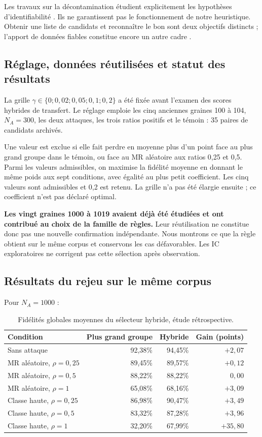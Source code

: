 \documentclass[11pt,a4paper]{article}
\begin{document}
Les travaux sur la décontamination étudient explicitement les hypothèses
d'identifiabilité \cite{scott,katz}. Ils ne garantissent pas le fonctionnement
de notre heuristique. Obtenir une liste de candidats et reconnaître le bon
sont deux objectifs distincts ; l'apport de données fiables constitue encore
un autre cadre \cite{charikar}.

\subsection{Réglage, données réutilisées et statut des résultats}

La grille $\gamma\in\{0;0,02;0,05;0,1;0,2\}$ a été fixée avant l'examen des
scores hybrides de transfert. Le réglage emploie les cinq anciennes graines
100 à 104, $N_A=300$, les deux attaques, les trois ratios positifs et le témoin :
35 paires de candidats archivés.

Une valeur est exclue si elle fait perdre en moyenne plus d'un point face au
plus grand groupe dans le témoin, ou face au MR aléatoire aux ratios 0,25 et
0,5. Parmi les valeurs admissibles, on maximise la fidélité moyenne en donnant
le même poids aux sept conditions, avec égalité au plus petit coefficient.
Les cinq valeurs sont admissibles et 0,2 est retenu. La grille n'a pas été
élargie ensuite ; ce coefficient n'est pas déclaré optimal.

\textbf{Les vingt graines 1000 à 1019 avaient déjà été étudiées et ont contribué
au choix de la famille de règles.} Leur réutilisation ne constitue donc pas une
nouvelle confirmation indépendante. Nous montrons ce que la règle obtient sur
le même corpus et conservons les cas défavorables. Les IC exploratoires ne
corrigent pas cette sélection après observation.

\subsection{Résultats du rejeu sur le même corpus}

Pour $N_A=1000$ :
\begin{table}[htbp]\centering\small
\begin{tabular}{lrrr}
\toprule
Condition & Plus grand groupe & Hybride & Gain (points) \\
\midrule
Sans attaque & 92,38\% & 94,45\% & $+2,07$ \\
MR aléatoire, $\rho=0,25$ & 89,45\% & 89,57\% & $+0,12$ \\
MR aléatoire, $\rho=0,5$ & 88,22\% & 88,22\% & $0,00$ \\
MR aléatoire, $\rho=1$ & 65,08\% & 68,16\% & $+3,09$ \\
Classe haute, $\rho=0,25$ & 86,98\% & 90,47\% & $+3,49$ \\
Classe haute, $\rho=0,5$ & 83,32\% & 87,28\% & $+3,96$ \\
Classe haute, $\rho=1$ & 32,20\% & 67,99\% & $+35,80$ \\
\bottomrule
\end{tabular}
\caption{Fidélités globales moyennes du sélecteur hybride, étude rétrospective.}
\end{table}
\end{document}
